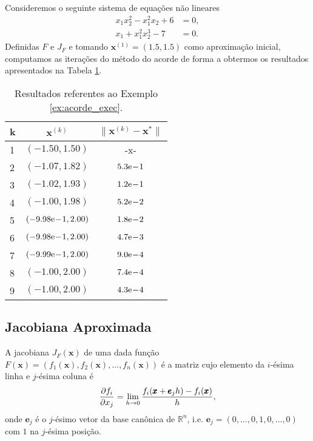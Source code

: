 \begin{ex}\label{ex:acorde_exec}
  Consideremos o seguinte sistema de equações não lineares
  \begin{align}
    x_1x_2^2 - x_1^2x_2 + 6 &= 0,\\
    x_1 + x_1^2x_2^3 - 7 &= 0.
  \end{align}
  Definidas $F$ e $J_F$ e tomando $\pmb{x}^{(1)} = (1.5, 1.5)$ como aproximação inicial, computamos as iterações do método do acorde de forma a obtermos os resultados apresentados na Tabela \ref{tab:ex_acorde_exec}.

  \begin{table}[h!]
    \centering
    \begin{tabular}{lcc}
      k & $\pmb{x}^{(k)}$ & $\|\pmb{x}^{(k)} - \pmb{x}^*\|$\\\hline
      1 & $(-1.50, 1.50)$ & -x- \\
      2 & $(-1.07, 1.82)$ & $5.3\mathrm{e}\!-\!1$ \\
      3 & $(-1.02, 1.93)$ & $1.2\mathrm{e}\!-\!1$ \\
      4 & $(-1.00, 1.98)$ & $5.2\mathrm{e}\!-\!2$ \\
      5 & $(-9.98\mathrm{e}\!-\!1, 2.00)$ & $1.8\mathrm{e}\!-\!2$ \\
      6 & $(-9.98\mathrm{e}\!-\!1, 2.00)$ & $4.7\mathrm{e}\!-\!3$ \\
      7 & $(-9.99\mathrm{e}\!-\!1, 2.00)$ & $9.0\mathrm{e}\!-\!4$ \\
      8 & $(-1.00, 2.00)$ & $7.4\mathrm{e}\!-\!4$ \\
      9 & $(-1.00, 2.00)$ & $4.3\mathrm{e}\!-\!4$ \\\hline
    \end{tabular}
    \caption{Resultados referentes ao Exemplo \ref{ex:acorde_exec}.}
    \label{tab:ex_acorde_exec}
  \end{table}

% 
\end{ex}

\subsection{Jacobiana Aproximada}
\badgeRevisar

A jacobiana $J_F(\pmb{x})$ de uma dada função $F(\pmb{x}) = (f_1(\pmb{x}), f_2(\pmb{x}), \dotsc, f_n(\pmb{x}))$ é a matriz cujo elemento da $i$-ésima linha e $j$-ésima coluna é
\begin{equation}
  \frac{\partial f_i}{\partial x_j} = \lim_{h\to 0} \frac{f_i(\pmb{x}+\pmb{e}_jh) - f_i(\pmb{x})}{h},
\end{equation}
onde $\pmb{e}_j$ é o $j$-ésimo vetor da base canônica de $\mathbb{R}^n$, i.e. $\pmb{e}_j = (0, \dotsc, 0, 1, 0, \dotsc, 0)$ com $1$ na $j$-ésima posição.

